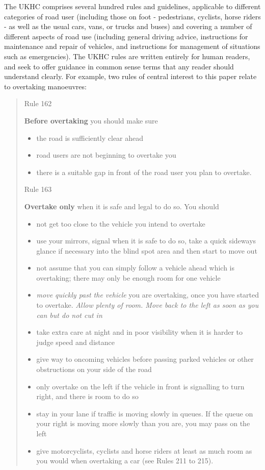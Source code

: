 The UKHC comprises several hundred rules and guidelines, applicable to different categories of road user (including those on foot - pedestrians, cyclists, horse riders - as well as the usual cars, vans, or trucks and buses) and covering a number of different aspects of road use (including general driving advice, instructions for maintenance and repair of vehicles, and instructions for management of situations such as emergencies). The UKHC rules are written entirely for human readers, and seek to offer guidance in common sense terms that any reader should understand clearly. For example, two rules of central interest to this paper relate to overtaking manoeuvres:
\begin{quote}
    Rule 162
    
    \textbf{Before overtaking} you should make sure
    \begin{itemize}
        \item the road is sufficiently clear ahead
        \item road users are not beginning to overtake you
        \item there is a suitable gap in front of the road user you plan to overtake.
    \end{itemize}
    
    Rule 163
    
    \textbf{Overtake only} when it is safe and legal to do so. You should
    \begin{itemize}
        \item not get too close to the vehicle you intend to overtake
        \item use your mirrors, signal when it is safe to do so, take a quick sideways glance if necessary into the blind spot area and then start to move out
        \item not assume that you can simply follow a vehicle ahead which is overtaking; there may only be enough room for one vehicle
        \item \emph{move quickly past the vehicle} you are overtaking, once you have started to overtake. \emph{Allow plenty of room. Move back to the left as soon as you can but do not cut in}
        \item take extra care at night and in poor visibility when it is harder to judge speed and distance
        \item give way to oncoming vehicles before passing parked vehicles or other obstructions on your side of the road
        \item only overtake on the left if the vehicle in front is signalling to turn right, and there is room to do so
        \item stay in your lane if traffic is moving slowly in queues. If the queue on your right is moving more slowly than you are, you may pass on the left
        \item give motorcyclists, cyclists and horse riders at least as much room as you would when overtaking a car (see Rules 211 to 215).
    \end{itemize}
\end{quote}
